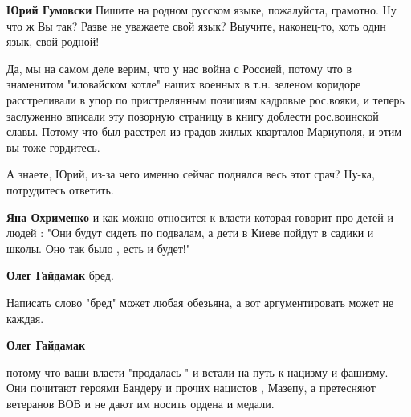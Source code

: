 \begin{itemize}
\textbf{Юрий Гумовски} Пишите на родном русском языке, пожалуйста, грамотно. Ну что ж Вы так? Разве не уважаете свой язык? Выучите, наконец-то, хоть один язык, свой родной!



Да, мы на самом деле верим, что у нас война с Россией, потому что в знаменитом
"иловайском котле" наших военных в т.н. зеленом коридоре расстреливали в упор
по пристрелянным позициям кадровые рос.вояки, и теперь заслуженно вписали эту
позорную страницу в книгу доблести рос.воинской славы. Потому что был расстрел
из градов жилых кварталов Мариуполя, и этим вы тоже гордитесь.


А знаете, Юрий, из-за чего именно сейчас поднялся весь этот срач? Ну-ка, потрудитесь ответить.


\textbf{Яна Охрименко} и как можно относится к власти которая говорит про детей и людей : "Они будут сидеть по подвалам, а дети в Киеве пойдут в садики и школы. Оно так было , есть и будет!"


\textbf{Олег Гайдамак} бред.


Написать слово "бред" может любая обезьяна, а вот аргументировать может не каждая.


\textbf{Олег Гайдамак} 

потому что ваши власти "продалась " и встали на путь к нацизму и фашизму. Они
почитают героями Бандеру и прочих нацистов , Мазепу, а претесняют ветеранов ВОВ
и не дают им носить ордена и медали.



\end{itemize}
